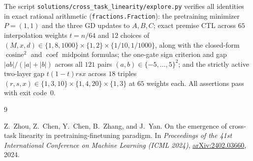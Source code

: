 \documentclass[11pt]{article}
\theoremstyle{plain}
\theoremstyle{definition}
\theoremstyle{remark}
\DeclareMathOperator{\cosine}{cosine}
\DeclareMathOperator{\coef}{coef}
\begin{document}
The script \texttt{solutions/cross\_task\_linearity/explore.py} verifies all identities in exact rational arithmetic (\texttt{fractions.Fraction}): the pretraining minimizer $P = (1, 1)$ and the three GD updates to $A, B, C$; exact premise CTL across $65$ interpolation weights $t = n/64$ and $12$ choices of $(M, x, d) \in \{1, 8, 1000\} \times \{1, 2\} \times \{1/10, 1/1000\}$, along with the closed-form $\cosine^2$ and $\coef$ midpoint formulas; the one-gate sign criterion and gap $|ab|/(|a| + |b|)$ across all $121$ pairs $(a, b) \in \{-5, \dots, 5\}^2$; and the strictly active two-layer gap $t(1 - t)rsx$ across $18$ triples $(r, s, x) \in \{1, 3, 10\} \times \{1, 4, 20\} \times \{1, 3\}$ at $65$ weights each. All assertions pass with exit code~$0$.

\begin{thebibliography}{9}

Z.~Zhou, Z.~Chen, Y.~Chen, B.~Zhang, and J.~Yan.
On the emergence of cross-task linearity in pretraining-finetuning paradigm.
In \emph{Proceedings of the 41st International Conference on Machine Learning (ICML 2024)},
\href{https://arxiv.org/abs/2402.03660}{arXiv:2402.03660}, 2024.

\end{thebibliography}
\end{document}
